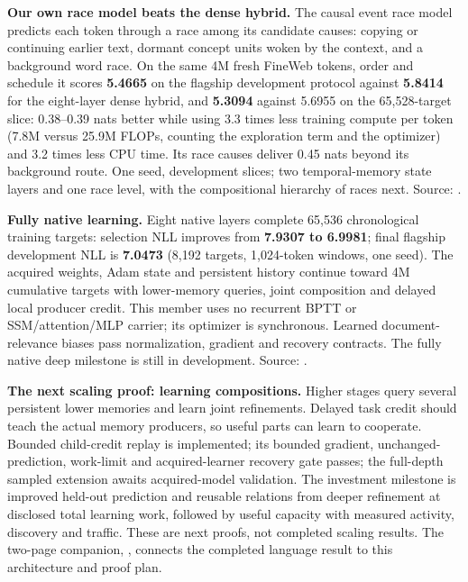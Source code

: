 \documentclass[10pt, a4 paper]{article}
\begin{document}
\textbf{Our own race model beats the dense hybrid.} The causal event race model predicts each token through a race among its candidate causes: copying or continuing earlier text, dormant concept units woken by the context, and a background word race. On the same 4M fresh FineWeb tokens, order and schedule it scores \textbf{5.4665} on the flagship development protocol against \textbf{5.8414} for the eight-layer dense hybrid, and \textbf{5.3094} against 5.6955 on the 65,528-target slice: 0.38--0.39 nats better while using 3.3 times less training compute per token (7.8M versus 25.9M FLOPs, counting the exploration term and the optimizer) and 3.2 times less CPU time. Its race causes deliver 0.45 nats beyond its background route. One seed, development slices; two temporal-memory state layers and one race level, with the compositional hierarchy of races next. Source: .

\textbf{Fully native learning.} Eight native layers complete 65,536 chronological training targets: selection NLL improves from \textbf{7.9307 to 6.9981}; final flagship development NLL is \textbf{7.0473} (8,192 targets, 1,024-token windows, one seed). The acquired weights, Adam state and persistent history continue toward 4M cumulative targets with lower-memory queries, joint composition and delayed local producer credit. This member uses no recurrent BPTT or SSM/attention/MLP carrier; its optimizer is synchronous. Learned document-relevance biases pass normalization, gradient and recovery contracts. The fully native deep milestone is still in development. Source: .

\textbf{The next scaling proof: learning compositions.} Higher stages query several persistent lower memories and learn joint refinements. Delayed task credit should teach the actual memory producers, so useful parts can learn to cooperate. Bounded child-credit replay is implemented; its bounded gradient, unchanged-prediction, work-limit and acquired-learner recovery gate passes; the full-depth sampled extension awaits acquired-model validation. The investment milestone is improved held-out prediction and reusable relations from deeper refinement at disclosed total learning work, followed by useful capacity with measured activity, discovery and traffic. These are next proofs, not completed scaling results. The two-page companion, , connects the completed language result to this architecture and proof plan.
\end{document}
